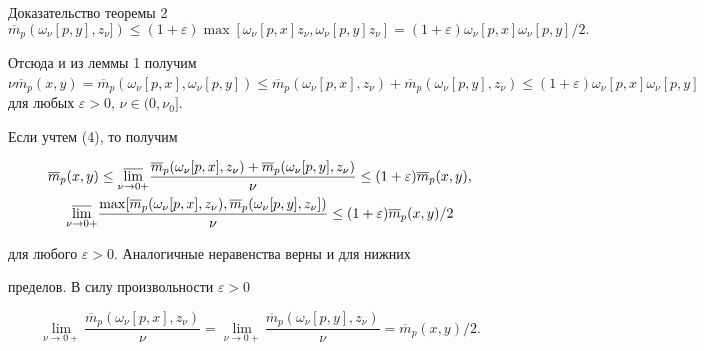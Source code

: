 \begin{pf*}{Доказательство теоремы 2}
\begin{equation}
\overline{m}_p(\omega_\nu[p,y],z_\nu])\leq 


(1+\varepsilon)\max[\omega_\nu[p,x]z_\nu,\omega_\nu[p,y]z_\nu]=(1+


\varepsilon)\omega_\nu[p,x]\omega_\nu[p,y]/2.


\end{equation}


Отсюда и из леммы 1 получим $\nu\overline{m}_p(x,y)=


\overline{m}_p(\omega_\nu[p,x],\omega_\nu[p,y]) \leq


\overline{m}_p(\omega_\nu[p,x],z_\nu)+


\overline{m}_p(\omega_\nu[p,y],z_\nu) \leq (1+


\varepsilon)\omega_\nu[p,x]\omega_\nu[p,y]$ для любых $\varepsilon


> 0$, $\nu \in (0,\nu_0]$.


Если учтем (4), то получим


\begin{gather*}


\overline{m}_p(x,y) \leq


\underset{\nu \to 0+}{\varlimsup}{}{\frac{\overline{m}_p(\omega_\nu[p,x],z_\nu)+


\overline{m}_p(\omega_\nu[p,y],z_\nu)}{\nu}} \leq (1+\varepsilon)


\overline{m}_p(x,y), \\


%


\underset{\nu \to 0+}{\varlimsup}{}


{\frac{\max[\overline{m}_p(\omega_\nu[p,x],z_\nu),


\overline{m}_p(\omega_\nu[p,y],z_\nu])}


{\nu}} \leq (1+\varepsilon)\overline{m}_p(x,y)/2


\end{gather*}


для любого $\varepsilon>0$. Аналогичные неравенства верны и для нижних


пределов. В силу произвольности $\varepsilon>0$


$$


\lim\limits_{\nu \to


0+}{\frac{\overline{m}_p(\omega_\nu[p,x],z_\nu)}{\nu}}=


\lim\limits_{\nu \to 0+}{\frac{\overline{m}_p(\omega_\nu[p,y],z_\nu)}{\nu}}=


\overline{m}_p(x,y)/2.


$$



\end{pf*}
